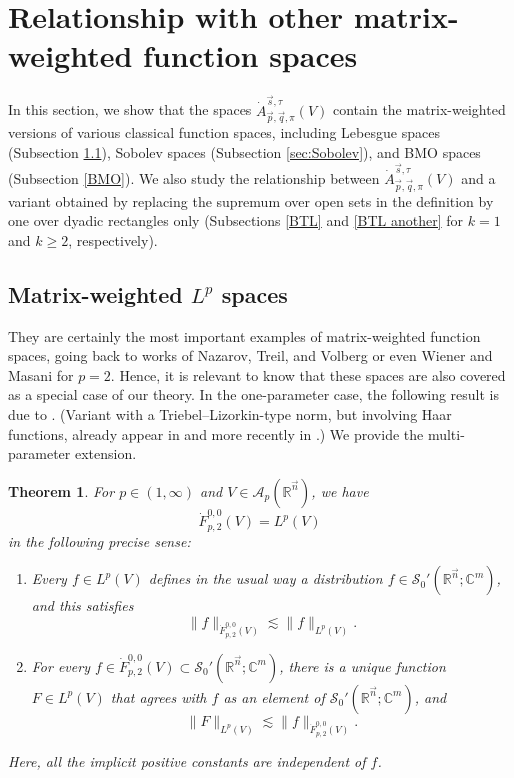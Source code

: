 \documentclass[11pt, reqno]{amsart}
\newtheorem{theorem}{Theorem}[section]
\theoremstyle{definition}
\theoremstyle{remark}
\numberwithin{equation}{section}
\newcommand{\A}{\mathscr A}
\newcommand{\C}{\mathbb C}
\newcommand{\R}{\mathbb R}
\newcommand{\Sc}{\mathscr S}
\newcommand{\vn}{\vec n}
\newcommand{\vp}{\vec p}
\newcommand{\vq}{\vec q}
\newcommand{\vs}{\vec s}
\newcommand{\Atau}{\dot A^{\vs,\tau}_{\vp,\vq,\pi}}
\newcommand{\Norm}[2]{\|#1\|_{#2}}
\begin{document}
\section{Relationship with other matrix-weighted function spaces}\label{other}

In this section, we show that the spaces $\Atau(V)$ contain
the matrix-weighted versions of various classical function spaces, including Lebesgue spaces (Subsection \ref{Lp}),
Sobolev spaces (Subsection \ref{sec:Sobolev}),
and BMO spaces (Subsection \ref{BMO}).
We also study the relationship between
$\Atau(V)$ and a variant obtained by replacing the supremum over open sets in the definition by one over dyadic rectangles only (Subsections \ref{BTL} and \ref{BTL another} for $k=1$
and $k\geq 2$, respectively).

\subsection{Matrix-weighted $L^p$ spaces}\label{Lp}

They are certainly the most important examples of matrix-weighted function spaces, going back to works of Nazarov, Treil, and Volberg \cite{NT96,TV97,Vol97} or even Wiener and Masani \cite{WM58} for $p=2$. Hence, it is relevant to know that these spaces are also covered as a special case of our theory. In the one-parameter case, the following result is due to \cite[Theorem 4.1]{FR21}. (Variant with a Triebel--Lizorkin-type norm, but involving Haar functions, already appear in \cite{NT96,Vol97} and more recently in \cite{Is21}.) We provide the multi-parameter extension.

\begin{theorem}\label{Lp=F}
For $p\in(1,\infty)$ and $V\in\A_p(\R^{\vn})$, we have
\begin{equation*}
\dot F^{0,0}_{p,2}(V)=L^p(V)
\end{equation*}
in the following precise sense:
\begin{enumerate}[\rm(i)]
\item\label{Lp subset F} Every $f\in L^p(V)$ defines in the usual way a distribution $f\in\Sc_0'(\R^{\vn};\C^m)$, and this satisfies
\begin{equation*}
\Norm{f}{\dot F^{0,0}_{p,2}(V)}\lesssim\Norm{f}{L^p(V)}.
\end{equation*}

\item\label{F subset Lp} For every $f\in\dot F^{0,0}_{p,2}(V)\subset\Sc_0'(\R^{\vn};\C^m)$, there is a unique function $F\in L^p(V)$ that agrees with $f$ as an element of $\Sc_0'(\R^{\vn};\C^m)$, and
\begin{equation*}
\Norm{F}{L^p(V)}\lesssim\Norm{f}{\dot F^{0,0}_{p,2}(V)}.
\end{equation*}
\end{enumerate}
Here, all the implicit positive constants are independent of $f$.
\end{theorem}
\end{document}
